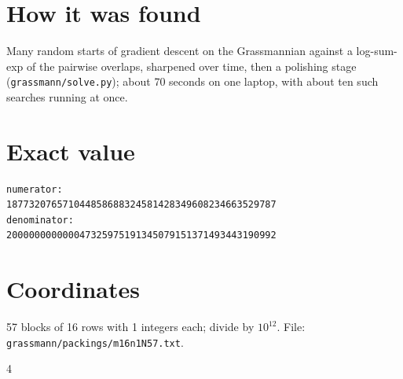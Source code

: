 \documentclass[11pt,a4paper]{article}
\begin{document}
\section{How it was found}
Many random starts of gradient descent on the Grassmannian against a log-sum-exp of the pairwise overlaps, sharpened over time, then a polishing stage (\texttt{grassmann/solve.py}); about 70 seconds on one laptop, with about ten such searches running at once.


\appendix
\section{Exact value}
{\small
\begin{verbatim}
numerator:
187732076571044858688324581428349608234663529787
denominator:
200000000000047325975191345079151371493443190992
\end{verbatim}}

\section{Coordinates}
57 blocks of 16 rows with 1 integers each; divide by $10^{12}$. File: \texttt{grassmann/packings/m16n1N57.txt}.
{\tiny
\begin{multicols}{4}
\end{multicols}}
\end{document}
